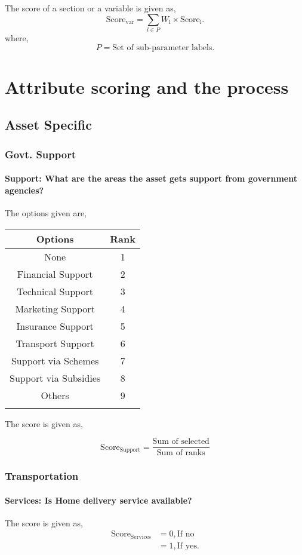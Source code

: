 \documentclass[oneside,twocolumn]{article}
\newcommand{\tsub}[2]{\text{#1}_{\text{#2}}}
\newcommand{\tsubb}[2]{#1_{\text{#2}}}
\newcommand{\dsub}[2]{\dfrac{\text{#1}}{\text{#2}}}
\newcommand{\multsel}[1]
{
	\[
		\tsub{Score}{#1} = \dsub{Sum of selected}{Sum of ranks}
	\]
}
\newenvironment{ttable}
{
\begin{center}
\begin{tabular}{c|c}
\hline
}
{
\\ \hline
\end{tabular}
\end{center}
}
\begin{document}
The score of a section or a variable is given as,
\[
	\tsub{Score}{var} = \sum_{l \in P} \tsubb{W}{l} \times \tsub{Score}{l}.
\]
where,
\[
	P = \text{Set of sub-parameter labels.}
\]
\section{Attribute scoring and the
process}
\subsection{Asset Specific}
\subsubsection{Govt. Support}

\paragraph{Support: What are the areas the asset gets support from government agencies?}

The options given are,
\begin{ttable}
Options & Rank \\ \hline
None & 1 \\
Financial Support & 2 \\
Technical Support & 3 \\
Marketing Support & 4 \\
Insurance Support & 5 \\
Transport Support & 6 \\
Support via Schemes & 7 \\
Support via Subsidies & 8 \\
Others & 9 \\
\hline
\end{ttable}
The score is given as,
\multsel{Support}
\subsubsection{Transportation}

\paragraph{Services: Is Home delivery service available?}

The score is given as,
\begin{align*}
\tsub{Score}{Services} &= 0, \text{If no} \\
        &= 1, \text{If yes}.
\end{align*}
\end{document}
